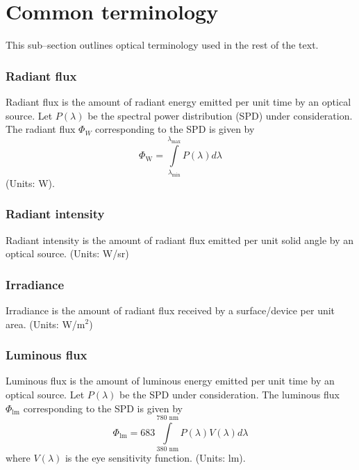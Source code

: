 \section{Common terminology}
\label{sec:outlineTerminology}
\graphicspath{{_SISO/Figures/}}
This sub--section outlines optical terminology used in the rest of the text.
\subsubsection{Radiant flux}
\label{subsubsec:radiantFlux}
Radiant flux is the amount of radiant energy emitted per unit time by an optical source. Let $P(\lambda)$ be the spectral power distribution (SPD) under consideration. The radiant flux $\Phi_{W}$ corresponding to the SPD is given by 
\begin{equation}
	\Phi_{\text{W}} = \int\limits_{\lambda_{\text{min}}}^{\lambda_{\text{max}}}P(\lambda)d\lambda
	\label{eqRadiantFlux}
\end{equation}
(Units: W).

\subsubsection{Radiant intensity}
\label{subsubsec:radiantIntensity}
Radiant intensity is the amount of radiant flux emitted per unit solid angle by an optical source. (Units: W/sr)

\subsubsection{Irradiance}
\label{subsubsec:irradiance}
Irradiance is the amount of radiant flux received by a surface/device per unit area. (Units: W/m$^{2}$)

\subsubsection{Luminous flux}
\label{subsubsec:luminousFlux}
Luminous flux is the amount of luminous energy emitted per unit time by an optical source. Let $P(\lambda)$ be the SPD under consideration. The luminous flux $\Phi_{\text{lm}}$ corresponding to the SPD is given by \cite{gru08b}
\begin{equation}
	\Phi_{\text{lm}} = 683\int\limits_{380\text{ nm}}^{780\text{ nm}}P(\lambda)V(\lambda)d\lambda
	\label{eqLuminousFlux}
\end{equation}
where $V(\lambda)$ is the eye sensitivity function. (Units: lm).

